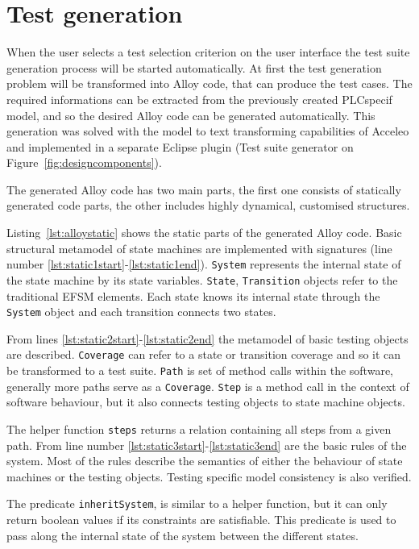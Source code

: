 \section{Test generation}
\label{sec:testgenerationimplementation}
	
When the user selects a test selection criterion on the user interface the test suite generation process will be started automatically. At first the test generation problem will be transformed into Alloy code, that can produce the test cases. The required informations can be extracted from the previously created PLCspecif model, and so the desired Alloy code can be generated automatically. This generation was solved with the model to text transforming capabilities of Acceleo and implemented in a separate Eclipse plugin (Test suite generator on Figure~\ref{fig:designcomponents}).
	
The generated Alloy code has two main parts, the first one consists of statically generated code parts, the other includes highly dynamical, customised structures.
	
Listing~\ref{lst:alloystatic} shows the static parts of the generated Alloy code. Basic structural metamodel of state machines are implemented with signatures (line number  \ref{lst:static1start}-\ref{lst:static1end}). \texttt{System} represents the internal state of the state machine by its state variables. \texttt{State}, \texttt{Transition} objects refer to the traditional EFSM elements. Each state knows its internal state through the \texttt{System} object and each transition connects two states.
	
From lines \ref{lst:static2start}-\ref{lst:static2end} the metamodel of basic testing objects are described. \texttt{Coverage} can refer to a state or transition coverage and so it can be transformed to a test suite. \texttt{Path} is set of method calls within the software, generally more paths serve as a \texttt{Coverage}. \texttt{Step} is a method call in the context of software behaviour, but it also connects testing objects to state machine objects.
	
The helper function \texttt{steps} returns a relation containing all steps from a given path. From line number \ref{lst:static3start}-\ref{lst:static3end} are the basic rules of the system. Most of the rules describe the semantics of either the behaviour of state machines or the testing objects. Testing specific model consistency is also verified.

The predicate \texttt{inheritSystem}, is similar to a helper function, but it can only return boolean values if its constraints are satisfiable. This predicate is used to pass along the internal state of the system between the different states.
	
